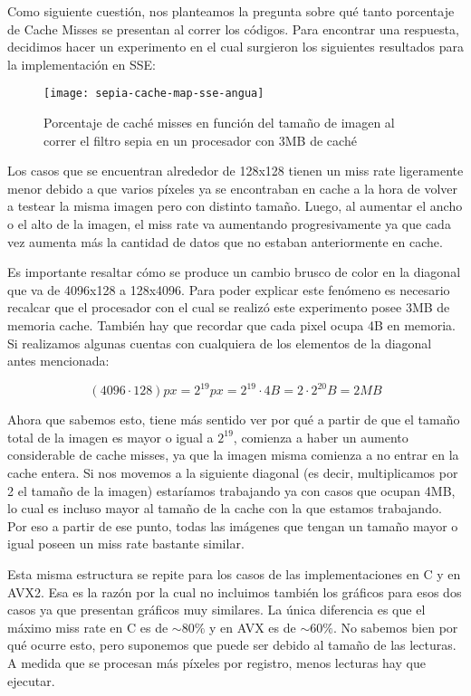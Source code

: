 Como siguiente cuestión, nos planteamos la pregunta sobre qué tanto porcentaje de Cache Misses se presentan al correr los códigos. Para encontrar una respuesta, decidimos hacer un experimento en el cual surgieron los siguientes resultados para la implementación en SSE:

\begin{figure}[h]
    \centering
    \texttt{[image: sepia-cache-map-sse-angua]}
    \caption{Porcentaje de caché misses en función del tamaño de imagen al correr el filtro sepia en un procesador con 3MB de caché}
    \label{fig:sepia-cache-map-sse-angua}
\end{figure}

Los casos que se encuentran alrededor de 128x128 tienen un miss rate ligeramente menor debido a que varios píxeles ya se encontraban en cache a la hora de volver a testear la misma imagen pero con distinto tamaño. Luego, al aumentar el ancho o el alto de la imagen, el miss rate va aumentando progresivamente ya que cada vez aumenta más la cantidad de datos que no estaban anteriormente en cache.

Es importante resaltar cómo se produce un cambio brusco de color en la diagonal que va de 4096x128 a 128x4096. Para poder explicar este fenómeno es necesario recalcar que el procesador con el cual se realizó este experimento posee 3MB de memoria cache. También hay que recordar que cada pixel ocupa 4B en memoria. Si realizamos algunas cuentas con cualquiera de los elementos de la diagonal antes mencionada:

$$(4096 \cdot 128) px = 2^{19} px = 2^{19} \cdot 4 B = 2 \cdot 2^{20} B = 2MB$$

Ahora que sabemos esto, tiene más sentido ver por qué a partir de que el tamaño total de la imagen es mayor o igual a $2^{19}$, comienza a haber un aumento considerable de cache misses, ya que la imagen misma comienza a no entrar en la cache entera. Si nos movemos a la siguiente diagonal (es decir, multiplicamos por 2 el tamaño de la imagen) estaríamos trabajando ya con casos que ocupan 4MB, lo cual es incluso mayor al tamaño de la cache con la que estamos trabajando. Por eso a partir de ese punto, todas las imágenes que tengan un tamaño mayor o igual poseen un miss rate bastante similar.

Esta misma estructura se repite para los casos de las implementaciones en C y en AVX2. Esa es la razón por la cual no incluimos también los gráficos para esos dos casos ya que presentan gráficos muy similares. La única diferencia es que el máximo miss rate en C es de $\sim80\%$ y en AVX es de $\sim60\%$. No sabemos bien por qué ocurre esto, pero suponemos que puede ser debido al tamaño de las lecturas. A medida que se procesan más píxeles por registro, menos lecturas hay que ejecutar.

